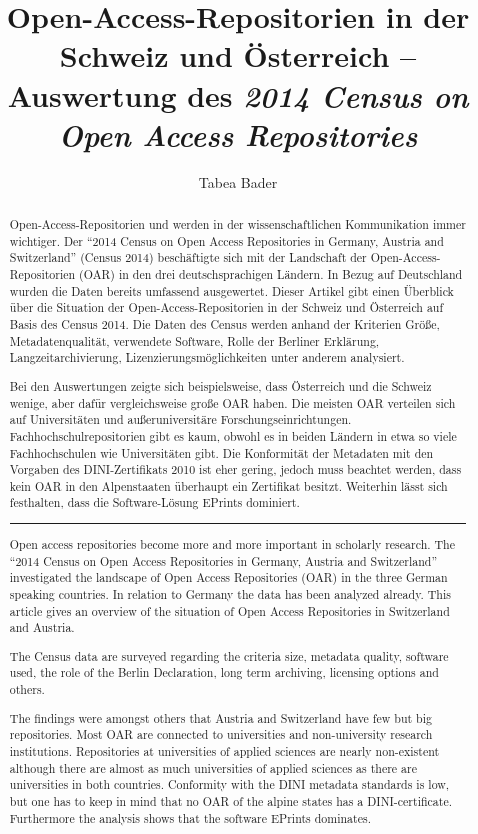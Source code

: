 \documentclass[a4paper,
fontsize=11pt,
oneside,
numbers=noperiodatend,
parskip=half-,
bibliography=totoc,
final
]{scrartcl}
\title{\LARGE{Open-Access-Repositorien in der Schweiz und Österreich -- Auswertung des \textit{2014 Census on Open Access Repositories}}} %
\author{Tabea Bader} %
\date{}
\begin{document}
\maketitle
\thispagestyle{fancyplain} 

\begin{abstract}
\small
Open-Access-Repositorien und werden in der wissenschaftlichen
Kommunikation immer wichtiger. Der ``2014 Census on Open Access
Repositories in Germany, Austria and Switzerland'' (Census 2014)
beschäftigte sich mit der Landschaft der Open-Access-Repositorien (OAR)
in den drei deutschsprachigen Ländern. In Bezug auf Deutschland wurden
die Daten bereits umfassend ausgewertet. Dieser Artikel gibt einen
Überblick über die Situation der Open-Access-Repositorien in der Schweiz
und Österreich auf Basis des Census 2014. Die Daten des Census werden
anhand der Kriterien Größe, Metadatenqualität, verwendete Software,
Rolle der Berliner Erklärung, Langzeitarchivierung,
Lizenzierungsmöglichkeiten unter anderem analysiert.

Bei den Auswertungen zeigte sich beispielsweise, dass Österreich und die
Schweiz wenige, aber dafür vergleichsweise große OAR haben. Die meisten
OAR verteilen sich auf Universitäten und außeruniversitäre
Forschungseinrichtungen. Fachhochschulrepositorien gibt es kaum, obwohl
es in beiden Ländern in etwa so viele Fachhochschulen wie Universitäten
gibt. Die Konformität der Metadaten mit den Vorgaben des
DINI-Zertifikats 2010 ist eher gering, jedoch muss beachtet werden, dass
kein OAR in den Alpenstaaten überhaupt ein Zertifikat besitzt. Weiterhin
lässt sich festhalten, dass die Software-Lösung EPrints dominiert.

\begin{center}\rule{0.5\linewidth}{\linethickness}\end{center}

Open access repositories become more and more important in scholarly
research. The ``2014 Census on Open Access Repositories in Germany,
Austria and Switzerland'' investigated the landscape of Open Access
Repositories (OAR) in the three German speaking countries. In relation
to Germany the data has been analyzed already. This article gives an
overview of the situation of Open Access Repositories in Switzerland and
Austria.

The Census data are surveyed regarding the criteria size, metadata
quality, software used, the role of the Berlin Declaration, long term
archiving, licensing options and others.

The findings were amongst others that Austria and Switzerland have few
but big repositories. Most OAR are connected to universities and
non-university research institutions. Repositories at universities of
applied sciences are nearly non-existent although there are almost as
much universities of applied sciences as there are universities in both
countries. Conformity with the DINI metadata standards is low, but one
has to keep in mind that no OAR of the alpine states has a
DINI-certificate. Furthermore the analysis shows that the software
EPrints dominates.
\end{abstract}
\end{document}
